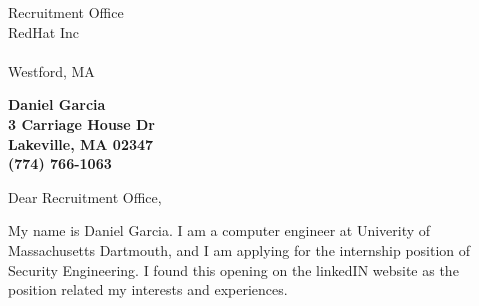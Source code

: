 \documentclass[11pt]{letter} %
\begin{document}

\begin{letter}{Recruitment Office\\
RedHat Inc\\ \\
Westford, MA} 


\begin{center}
\large\bf Daniel Garcia \\ %
3 Carriage House Dr \\ Lakeville, MA 02347 \\ (774) 766-1063 %
\end{center} 
\vfill

\signature{Daniel Garcia} %


\opening{Dear Recruitment Office,} 
 
My name is Daniel Garcia. I am a computer engineer at Univerity of Massachusetts Dartmouth, and I am applying for the internship position of Security Engineering. I found this opening on the linkedIN website as the position related my interests and experiences. 


\end{letter}
\end{document}
